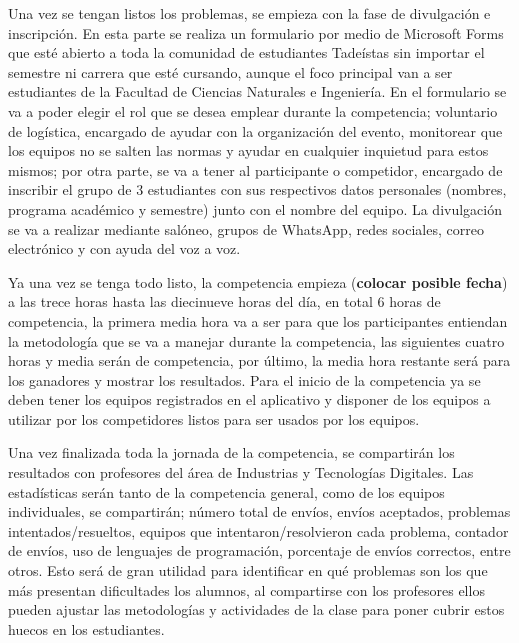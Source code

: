 \documentclass{article}
\begin{document}
Una vez se tengan listos los problemas, se empieza con la fase de divulgación e inscripción. En esta parte se realiza un formulario por medio de Microsoft Forms que esté abierto a toda la comunidad de estudiantes Tadeístas sin importar el semestre ni carrera que esté cursando, aunque el foco principal van a ser estudiantes de la Facultad de Ciencias Naturales e Ingeniería. En el formulario se va a poder elegir el rol que se desea emplear durante la competencia; voluntario de logística, encargado de ayudar con la organización del evento, monitorear que los equipos no se salten las normas y ayudar en cualquier inquietud para estos mismos; por otra parte, se va a tener al participante o competidor, encargado de inscribir el grupo de 3 estudiantes con sus respectivos datos personales (nombres, programa académico y semestre) junto con el nombre del equipo. La divulgación se va a realizar mediante salóneo, grupos de WhatsApp, redes sociales, correo electrónico y con ayuda del voz a voz.


Ya una vez se tenga todo listo, la competencia empieza (\textbf{colocar posible fecha})%
 a las trece horas hasta las diecinueve horas del día, en total 6 horas de competencia, la primera media hora va a ser para que los participantes entiendan la metodología que se va a manejar durante la competencia, las siguientes cuatro horas y media serán de competencia, por último, la media hora restante será para los ganadores y mostrar los resultados. Para el inicio de la competencia ya se deben tener los equipos registrados en el aplicativo y disponer de los equipos a utilizar por los competidores listos para ser usados por los equipos.


Una vez finalizada toda la jornada de la competencia, se compartirán los resultados con profesores del área de Industrias y Tecnologías Digitales. Las estadísticas serán tanto de la competencia general, como de los equipos individuales, se compartirán; número total de envíos, envíos aceptados, problemas intentados/resueltos, equipos que intentaron/resolvieron cada problema, contador de envíos, uso de lenguajes de programación, porcentaje de envíos correctos, entre otros. Esto será de gran utilidad para identificar en qué problemas son los que más presentan dificultades los alumnos, al compartirse con los profesores ellos pueden ajustar las metodologías y actividades de la clase para poner cubrir estos huecos en los estudiantes.
\end{document}

